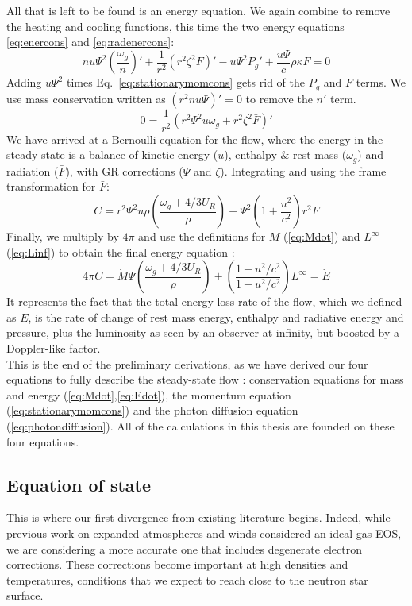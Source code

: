 \documentclass[../main.tex]{subfiles}
\begin{document}
All that is left to be found is an energy equation. We again combine to remove the heating and cooling functions, this time the two energy equations \eqref{eq:enercons} and \eqref{eq:radenercons}:
\begin{equation}
    n u\Psi^2\left(\frac{\omega_g}{n}\right)'+\frac{1}{r^2}\left(r^2\zeta^2\bar{F}\right)'-u\Psi^2P_g'+\frac{u\Psi}{c}\rho\kappa F=0
\end{equation}
Adding $u\Psi^2$ times Eq.~\eqref{eq:stationarymomcons} gets rid of the $P_g$ and $F$ terms. We use mass conservation written as $(r^2nu\Psi)'=0$ to remove the $n'$ term.
\begin{equation}
    0=\frac{1}{r^2}\left(r^2\Psi^2u\omega_g+r^2\zeta^2\bar{F}\right)'
\end{equation}
We have arrived at a Bernoulli equation for the flow, where the energy in the steady-state is a balance of kinetic energy ($u$), enthalpy \& rest mass ($\omega_g$) and radiation ($\bar{F}$), with GR corrections ($\Psi$ and $\zeta$). Integrating and using the frame transformation for $\bar{F}$:
\begin{equation}
    C=r^2\Psi^2u\rho\left(\frac{\omega_g+4/3U_R}{\rho}\right)+\Psi^2\left(1+\frac{u^2}{c^2}\right)r^2F
\end{equation}
Finally, we multiply by $4\pi$ and use the definitions for $\dot{M}$ (\ref{eq:Mdot}) and $L^\infty$ (\ref{eq:Linf}) to obtain the final energy equation :
\begin{equation}\label{eq:Edot}
    4\pi C=\boxed{\dot{M}\Psi\left(\frac{\omega_g+4/3U_R}{\rho}\right)+\left(\frac{1+u^2/c^2}{1-u^2/c^2}\right)L^\infty=\dot{E}}
\end{equation}
It represents the fact that the total energy loss rate of the flow, which we defined as $\dot{E}$, is the rate of change of rest mass energy, enthalpy and radiative energy and pressure, plus the luminosity as seen by an observer at infinity, but boosted by a Doppler-like factor.\\

This is the end of the preliminary derivations, as we have derived our four equations to fully describe the steady-state flow : conservation equations for mass and energy (\ref{eq:Mdot},\ref{eq:Edot}), the momentum equation (\ref{eq:stationarymomcons}) and the photon diffusion equation (\ref{eq:photondiffusion}). All of the calculations in this thesis are founded on these four equations.

\subsection{Equation of state}\label{sec:eos}
This is where our first divergence from existing literature begins. Indeed, while previous work on expanded atmospheres and winds considered an ideal gas EOS, we are considering a more accurate one that includes degenerate electron corrections.  These corrections become important at high densities and temperatures, conditions that we expect to reach close to the neutron star surface.\\
\end{document}
